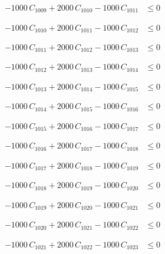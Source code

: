 \documentclass[a4paper,11pt]{article}
\begin{document}
\begin{align}
-1000\,C_{1009} + 2000\,C_{1010} - 1000\,C_{1011} &\leq 0 \nonumber
\end{align}

\begin{align}
-1000\,C_{1010} + 2000\,C_{1011} - 1000\,C_{1012} &\leq 0 \nonumber
\end{align}

\begin{align}
-1000\,C_{1011} + 2000\,C_{1012} - 1000\,C_{1013} &\leq 0 \nonumber
\end{align}

\begin{align}
-1000\,C_{1012} + 2000\,C_{1013} - 1000\,C_{1014} &\leq 0 \nonumber
\end{align}

\begin{align}
-1000\,C_{1013} + 2000\,C_{1014} - 1000\,C_{1015} &\leq 0 \nonumber
\end{align}

\begin{align}
-1000\,C_{1014} + 2000\,C_{1015} - 1000\,C_{1016} &\leq 0 \nonumber
\end{align}

\begin{align}
-1000\,C_{1015} + 2000\,C_{1016} - 1000\,C_{1017} &\leq 0 \nonumber
\end{align}

\begin{align}
-1000\,C_{1016} + 2000\,C_{1017} - 1000\,C_{1018} &\leq 0 \nonumber
\end{align}

\begin{align}
-1000\,C_{1017} + 2000\,C_{1018} - 1000\,C_{1019} &\leq 0 \nonumber
\end{align}

\begin{align}
-1000\,C_{1018} + 2000\,C_{1019} - 1000\,C_{1020} &\leq 0 \nonumber
\end{align}

\begin{align}
-1000\,C_{1019} + 2000\,C_{1020} - 1000\,C_{1021} &\leq 0 \nonumber
\end{align}

\begin{align}
-1000\,C_{1020} + 2000\,C_{1021} - 1000\,C_{1022} &\leq 0 \nonumber
\end{align}

\begin{align}
-1000\,C_{1021} + 2000\,C_{1022} - 1000\,C_{1023} &\leq 0 \nonumber
\end{align}
\end{document}
